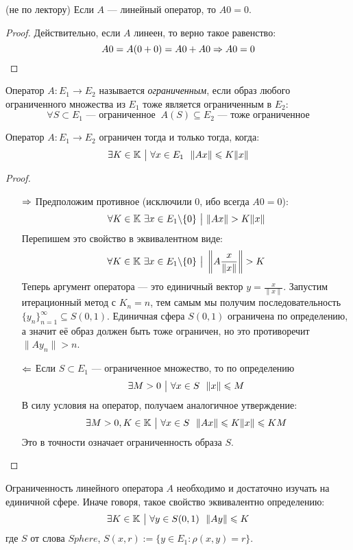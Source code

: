 \begin{proposition} (не по лектору)
	Если $A$ --- линейный оператор, то $A0 = 0$.
\end{proposition}

\begin{proof}
	Действительно, если $A$ линеен, то верно такое равенство:
	\[
		A0 = A(0 + 0) = A0 + A0 \Rightarrow A0 = 0
	\]
\end{proof}

\begin{definition}
	Оператор $A \colon E_1 \to E_2$ называется \textit{ограниченным}, если образ любого ограниченного множества из $E_1$ тоже является ограниченным в $E_2$:
	\[
		\forall S \subset E_1 \text{ --- ограниченное }\ A(S) \subseteq E_2 \text{ --- тоже ограниченное}
	\]
\end{definition}

\begin{proposition}
	Оператор $A \colon E_1 \to E_2$ ограничен тогда и только тогда, когда:
	\[
		\exists K \in \K \such \forall x \in E_1\ \ \|Ax\| \le K\|x\|
	\]
\end{proposition}

\begin{proof}~
	\begin{itemize}
		\item[$\Rightarrow$] Предположим противное (исключили 0, ибо всегда $A0 = 0$):
		\[
			\forall K \in \mathbb{K}\ \exists x \in E_1 \backslash \{0\} \ \big|\  \|Ax\| > K\|x\|
		\]
		Перепишем это свойство в эквивалентном виде:
		\[
			\forall K \in \K\ \exists x \in E_1 \bs \{0\} \such \no{A\frac{x}{\|x\|}} > K
		\]
		Теперь аргумент оператора --- это единичный вектор $y = \frac{x}{\|x\|}$. Запустим итерационный метод с $K_n = n$, тем самым мы получим последовательность $\{y_n\}_{n = 1}^\infty \subseteq S(0, 1)$. Единичная сфера $S(0, 1)$ ограничена по определению, а значит её образ должен быть тоже ограничен, но это противоречит $\|Ay_n\| > n$.
		
		\item[$\Leftarrow$] Если $S \subset E_1$ --- ограниченное множество, то по определению
		\[
			\exists M > 0 \ \big|\  \forall x \in S\ \ \|x\| \leqslant M
		\]
		В силу условия на оператор, получаем аналогичное утверждение:
		\[
			\exists M > 0, K \in \mathbb{K} \ \big|\  \forall x \in S\ \ \|Ax\| \leqslant K\|x\| \leqslant KM
		\]
		Это в точности означает ограниченность образа $S$.
	\end{itemize}
\end{proof}

\begin{proposition}
	Ограниченность линейного оператора $A$ необходимо и достаточно изучать на единичной сфере. Иначе говоря, такое свойство эквивалентно определению:
	\[
		\exists K \in \mathbb{K} \ \big|\  \forall y \in S(0, 1)\ \ \|Ay\| \leqslant K
	\]
	где $S$ от слова $Sphere$, $S(x, r) := \{y \in E_1 \colon \rho(x, y) = r\}$.
\end{proposition}

